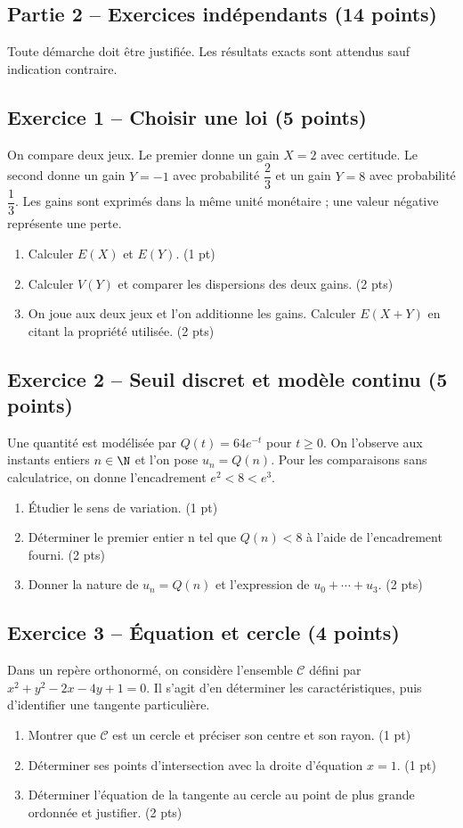 \clearpage\subsection*{Partie 2 -- Exercices indépendants (14 points)}
Toute démarche doit être justifiée. Les résultats exacts sont attendus sauf indication contraire.
\subsection*{Exercice 1 -- Choisir une loi (5 points)}
On compare deux jeux. Le premier donne un gain $X=2$ avec certitude. Le second donne un gain $Y=-1$ avec probabilité $\dfrac23$ et un gain $Y=8$ avec probabilité $\dfrac13$. Les gains sont exprimés dans la même unité monétaire ; une valeur négative représente une perte.
\begin{enumerate}
\item Calculer $E(X)$ et $E(Y)$. \hfill(1 pt)
\item Calculer $V(Y)$ et comparer les dispersions des deux gains. \hfill(2 pts)
\item On joue aux deux jeux et l’on additionne les gains. Calculer $E(X+Y)$ en citant la propriété utilisée. \hfill(2 pts)
\end{enumerate}
\subsection*{Exercice 2 -- Seuil discret et modèle continu (5 points)}
Une quantité est modélisée par $Q(t)=64e^{-t}$ pour $t\geq0$. On l’observe aux instants entiers $n\in\N$ et l’on pose $u_n=Q(n)$. Pour les comparaisons sans calculatrice, on donne l’encadrement $e^2<8<e^3$.
\begin{enumerate}
\item Étudier le sens de variation. \hfill(1 pt)
\item Déterminer le premier entier n tel que $Q(n)<8$ à l’aide de l’encadrement fourni. \hfill(2 pts)
\item Donner la nature de $u_n=Q(n)$ et l’expression de $u_0+\cdots+u_3$. \hfill(2 pts)
\end{enumerate}
\subsection*{Exercice 3 -- Équation et cercle (4 points)}
Dans un repère orthonormé, on considère l’ensemble $\mathcal C$ défini par $x^2+y^2-2x-4y+1=0$. Il s’agit d’en déterminer les caractéristiques, puis d’identifier une tangente particulière.
\begin{enumerate}
\item Montrer que $\mathcal C$ est un cercle et préciser son centre et son rayon. \hfill(1 pt)
\item Déterminer ses points d’intersection avec la droite d’équation $x=1$. \hfill(1 pt)
\item Déterminer l’équation de la tangente au cercle au point de plus grande ordonnée et justifier. \hfill(2 pts)
\end{enumerate}
